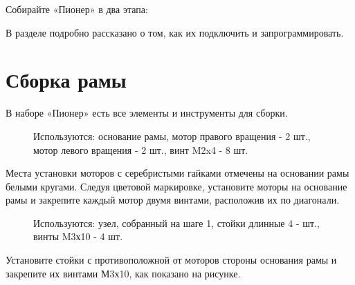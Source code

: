 \documentclass[a4paper,10pt,russian]{sphinxmanual}
\begin{document}

Собирайте «Пионер» в два этапа:

{\hyperref[\detokenize{const/const_frame::doc}]{}}

{\hyperref[\detokenize{const/const_protection::doc}]{}}

В разделе {\hyperref[\detokenize{module/module_main::doc}]{}} подробно рассказано о том, как их подключить и запрограммировать.


\section{Сборка рамы}
\label{\detokenize{const/const_frame:id1}}\label{\detokenize{const/const_frame::doc}}
В наборе «Пионер» есть все элементы и инструменты для сборки.


\begin{figure}[H]
\centering
\capstart

\noindent{}
\caption{Используются: основание рамы, мотор правого вращения - 2 шт., мотор левого вращения - 2 шт., винт M2x4 - 8 шт.}\label{\detokenize{const/const_frame:id2}}\end{figure}

Места установки моторов с серебристыми гайками отмечены на основании рамы белыми кругами. Следуя цветовой маркировке, установите моторы на основание рамы и закрепите каждый мотор двумя винтами, расположив их по диагонали.


\begin{figure}[H]
\centering
\capstart

\noindent{}
\caption{Используются: узел, собранный на шаге 1, стойки длинные 4 - шт., винты M3х10 - 4 шт.}\label{\detokenize{const/const_frame:id3}}\end{figure}

Установите стойки с противоположной от моторов стороны основания рамы и закрепите их винтами М3х10, как показано на рисунке.

\end{document}
